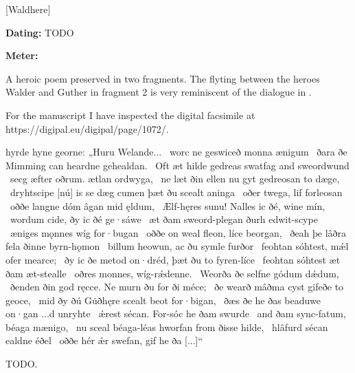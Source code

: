 [Waldhere]

\begin{flushright}%
\textbf{Dating:} TODO

\textbf{Meter:} \Fornyrdislag%
\end{flushright}%

A heroic poem preserved in two fragments.  The flyting between the heroes Walder and Guther in fragment 2 is very reminiscent of the dialogue in \Hildebrandslied.

For the manuscript I have inspected the digital facsimile at https://digipal.eu/digipal/page/1072/.

\sectionline

\bvg\bva hyrde hyne georne:
„Huru Welande... \hld\ worc ne geswiceð
monna ænigum \hld\ ðara ðe Mimming can
heardne gehealdan. \hld\ Oft æt hilde gedreas
swatfag and sweordwund \hld\ secg æfter oðrum.
ætlan ordwyga, \hld\ ne læt ðin ellen nu gyt
gedreosan to dæge, \hld\ dryhtscipe
[nú] is se dæg cumen
þæt ðu scealt aninga \hld\ oðer twega,
lif forleosan \hld\ oððe langne dóm
âgan mid ęldum, \hld\ Ælf-hęres sunu!
Nalles ic ðé, wine mín, \hld\ wordum cide,
ðy ic ðé ge·sáwe \hld\ æt ðam sweord-plegan
ðurh edwit-scype \hld\ æniges mǫnnes
wíg for·bugan \hld\ oððe on weal fleon,
líce beorgan, \hld\ ðeah þe lâðra fela
ðinne byrn-hǫmon \hld\ billum heowun,
ac ðu symle furðor \hld\ feohtan sóhtest,
mǽl ofer mearce; \hld\ ðy ic ðe metod on·dréd,
þæt ðu to fyren-líce \hld\ feohtan sóhtest
æt ðam æt-stealle \hld\ oðres monnes,
wíg-rǽdenne. \hld\ Weorða ðe selfne
gódum dǽdum, \hld\ ðenden ðin god ręcce.
Ne murn ðu for ði méce; \hld\ ðe wearð mâðma cyst
gifeðe to geoce, \hld\ mid ðy ðú Gu̇ðhęre scealt
beot for·bigan, \hld\ ðæs ðe he ðas beaduwe on·gan
...d unryhte \hld\ ǽrest sécan.
For-sóc he ðam swurde \hld\ and ðam sync-fatum,
béaga mænigo, \hld\ nu sceal béaga-léas
hworfan from ðisse hilde, \hld\ hlâfurd sécan
ealdne éðel \hld\ oððe hér ǽr swefan,
gif he ða [...]“\eva

\bvb TODO.\evb\evg

\sectionline

